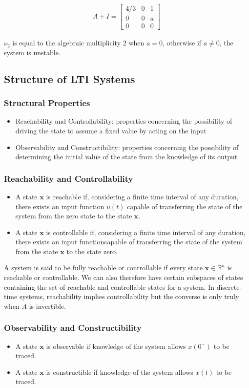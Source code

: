 \documentclass[11pt]{article}
\begin{document}
\begin{align}
  A + I = 
  \begin{bmatrix}
     4/3 & 0 & 1 \\
     0 & 0 & a \\
     0 & 0 & 0
  \end{bmatrix}
\end{align}

$\nu_2$ is equal to the algebraic multiplicity $2$ when $a=0$, otherwise if $a \neq 0$, the system is unstable.

\subsection{Structure of LTI Systems}
\subsubsection{Structural Properties}
\begin{itemize}
  \item Reachability and Controllability: properties concerning the possibility of driving the state to assume a fixed value by acting on the input
  \item Observability and Constructibility: properties concerning the possibility of determining the initial value of the state from the knowledge of its output
\end{itemize}

\subsubsection{Reachability and Controllability}
\begin{itemize}
  \item A state $\textbf{x}$ is reachable if, considering a finite time interval of any duration, there exists an input function $u(t)$ capable of transferring the state of the system from the zero state to the state $\textbf{x}$.
  \item A state $\textbf{x}$ is controllable if, considering a finite time interval of any duration, there exists an input functioncapable of transferring the state of the system from the state $\textbf{x}$ to the state zero.
\end{itemize}

A system is said to be fully reachable or controllable if every state $\textbf{x} \in \mathbb{R}^n$ is reachable or controllable.
We can also therefore have certain subspaces of states containing the set of reachable and controllable states for a system.
In discrete-time systems, reachability implies controllability but the converse is only truly when $A$ is invertible.

\subsubsection{Observability and Constructibility}
\begin{itemize}
  \item A state $\textbf{x}$ is observable if knowledge of the system allows $x(0^-)$ to be traced.
  \item A state $\textbf{x}$ is constructible if knowledge of the system allows $x(t)$ to be traced.
\end{itemize}
\end{document}

